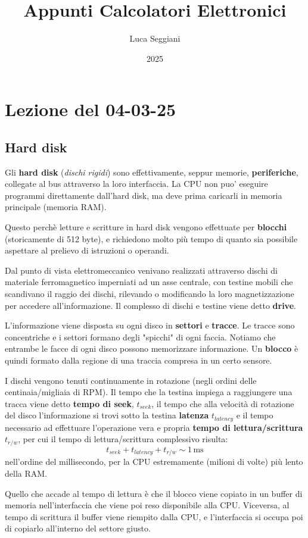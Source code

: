 \documentclass[a4paper,11pt]{article}
\title{Appunti Calcolatori Elettronici}
\author{Luca Seggiani}
\date{2025}
\begin{document}
\section{Lezione del 04-03-25}

\thispagestyle{empty}
\pagestyle{fancy}

\subsection{Hard disk}
Gli \textbf{hard disk} (\textit{dischi rigidi}) sono effettivamente, seppur memorie, \textbf{periferiche}, collegate al bus attraverso la loro interfaccia.
La CPU non puo' eseguire programmi direttamente dall'hard disk, ma deve prima caricarli in memoria principale (memoria RAM).

	Questo perchè letture e scritture in hard disk vengono effettuate per \textbf{blocchi} (storicamente di 512 byte), e richiedono molto più tempo di quanto sia possibile aspettare al prelievo di istruzioni o operandi.

Dal punto di vista elettromeccanico venivano realizzati attraverso dischi di materiale ferromagnetico imperniati ad un asse centrale, con testine mobili che scandivano il raggio dei dischi, rilevando o modificando la loro magnetizzazione per accedere all'informazione.
Il complesso di dischi e testine viene detto \textbf{drive}.

L'informazione viene disposta su ogni disco in \textbf{settori} e \textbf{tracce}.
Le tracce sono concentriche e i settori formano degli "spicchi" di ogni faccia.
Notiamo che entrambe le facce di ogni disco possono memorizzare informazione.
Un \textbf{blocco} è quindi formato dalla regione di una traccia compresa in un certo sensore.

I dischi vengono tenuti continuamente in rotazione (negli ordini delle centinaia/migliaia di RPM).
Il tempo che la testina impiega a raggiungere una tracca viene detto \textbf{tempo di seek}, $t_{seek}$, il tempo che alla velocità di rotazione del disco l'informazione si trovi sotto la testina \textbf{latenza} $t_{latency}$ e il tempo necessario ad effettuare l'operazione vera e propria \textbf{tempo di lettura/scrittura} $t_{r/w}$, per cui il tempo di lettura/scrittura complessivo risulta:
$$
t_{seek} + t_{latency} + t_{r/w} \sim 1 \, \mathrm{ms}
$$
nell'ordine del millisecondo, per la CPU estremamente (milioni di volte) più lento della RAM.

Quello che accade al tempo di lettura è che il blocco viene copiato in un buffer di memoria nell'interfaccia che viene poi reso disponibile alla CPU.
Viceversa, al tempo di scrittura il buffer viene riempito dalla CPU, e l'interfaccia si occupa poi di copiarlo all'interno del settore giusto.
\end{document}
